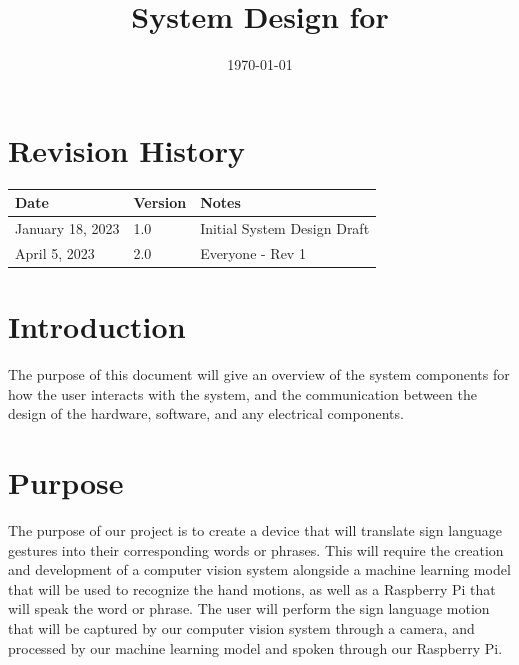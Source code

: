 \documentclass[12pt, titlepage]{article}
\begin{document}
\title{System Design for \progname{}} 
\author{\authname}
\date{\today}

\maketitle


\section{Revision History}

\begin{tabularx}{\textwidth}{p{3cm}p{2cm}X}
\toprule {\bf Date} & {\bf Version} & {\bf Notes}\\
\midrule
January 18, 2023 & 1.0 & Initial System Design Draft\\
April 5, 2023 & 2.0 & Everyone - Rev 1\\

\bottomrule
\end{tabularx}

\newpage

\tableofcontents

\newpage

\listoftables

\listoffigures

\newpage


\section{Introduction}
The purpose of this document will give an overview of the system components for how the user interacts with the system, 
and the communication between the design of the hardware, software, and any electrical components.

\section{Purpose}
The purpose of our project is to create a device that will translate sign language gestures into their corresponding words 
or phrases. This will require the creation and development of a computer vision system alongside a machine learning model that 
will be used to recognize the hand motions, as well as a Raspberry Pi that will speak the word or phrase. The user will perform 
the sign language motion that will be captured by our computer vision system through a camera, and processed by our machine learning 
model and spoken through our Raspberry Pi.
\end{document}
